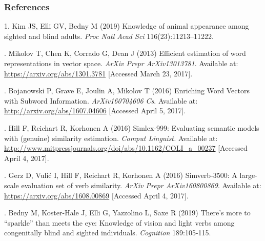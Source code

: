 \documentclass[12pt]{article}
\begin{document}
\subsubsection*{References}

1. 	Kim JS, Elli GV, Bedny M (2019) Knowledge of animal appearance among sighted and blind adults. {\it Proc Natl Acad Sci} 116(23):11213–11222.
\vspace{3mm}

. 	Mikolov T, Chen K, Corrado G, Dean J (2013) Efficient estimation of word representations in vector space. {\it ArXiv Prepr ArXiv13013781}. Available at: \url{https://arxiv.org/abs/1301.3781} [Accessed March 23, 2017].
\vspace{3mm}

. 	Bojanowski P, Grave E, Joulin A, Mikolov T (2016) Enriching Word Vectors with Subword Information. {\it ArXiv160704606 Cs}. Available at: \url{http://arxiv.org/abs/1607.04606} [Accessed April 5, 2017].
\vspace{3mm}

. 	Hill F, Reichart R, Korhonen A (2016) Simlex-999: Evaluating semantic models with (genuine) similarity estimation.  {\it Comput Linguist.} Available at: \url{http://www.mitpressjournals.org/doi/abs/10.1162/COLI_a_00237} [Accessed April 4, 2017].
\vspace{3mm}

. 	Gerz D, Vulić I, Hill F, Reichart R, Korhonen A (2016) Simverb-3500: A large-scale evaluation set of verb similarity.  {\it ArXiv Prepr ArXiv160800869}. Available at: \url{https://arxiv.org/abs/1608.00869} [Accessed April 4, 2017].
\vspace{3mm}

. 	Bedny M, Koster-Hale J, Elli G, Yazzolino L, Saxe R (2019) There's more to ``sparkle'' than meets the eye: Knowledge of vision and light verbs among congenitally blind and sighted individuals.  {\it Cognition} 189:105-115.
\end{document}
